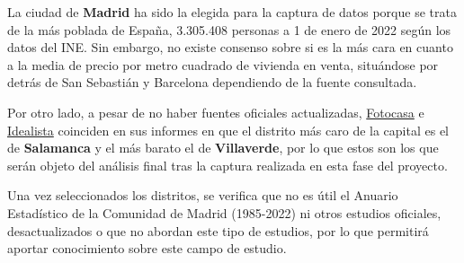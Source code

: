\documentclass[12pt]{article}
\begin{document}
La ciudad de \textbf{Madrid} ha sido la elegida para la captura de datos porque se trata de la más poblada de España, 3.305.408 personas a 1 de enero de 2022 según los datos del INE. Sin embargo, no existe consenso sobre si es la más cara en cuanto a la media de precio por metro cuadrado de vivienda en venta, situándose por detrás de San Sebastián y Barcelona dependiendo de la fuente consultada. 

Por otro lado, a pesar de no haber fuentes oficiales actualizadas, \href{https://www.fotocasa.es/fotocasa-life/compraventa/conoce-el-precio-de-la-vivienda-en-venta-este-mes/}{Fotocasa} e \href{https://www.idealista.com/sala-de-prensa/informes-precio-vivienda/venta/madrid-comunidad/madrid-provincia/madrid/}{Idealista} coinciden en sus informes en que el distrito más caro de la capital es el de \textbf{Salamanca} y el más barato el de \textbf{Villaverde}, por lo que estos son los que serán objeto del análisis final tras la captura realizada en esta fase del proyecto.

Una vez seleccionados los distritos, se verifica que no es útil el Anuario Estadístico de la Comunidad de Madrid (1985-2022) ni otros estudios oficiales, desactualizados o que no abordan este tipo de estudios, por lo que permitirá aportar conocimiento sobre este campo de estudio. 
\end{document}
